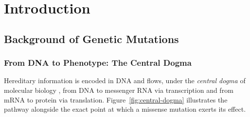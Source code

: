 \documentclass[11pt,a4paper,oneside]{report}
\begin{document}
\setcounter{page}{1}


\chapter{Introduction}
\label{ch:intro}

\section{Background of Genetic Mutations}
\label{sec:intro-background}

\subsection{From DNA to Phenotype: The Central Dogma}
\label{sec:intro-centraldogma}

Hereditary information is encoded in DNA and flows, under the
\emph{central dogma} of molecular biology
\citep{crick1970central}, from DNA to messenger RNA via
transcription and from mRNA to protein via translation.
Figure~\ref{fig:central-dogma} illustrates the pathway alongside
the exact point at which a missense mutation exerts its effect.
\end{document}
